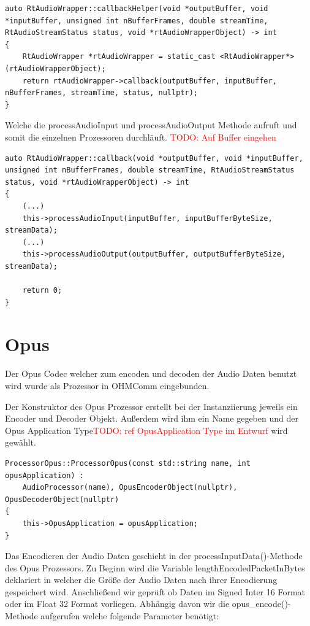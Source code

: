 \begin{lstlisting}[caption={callbackHelper Methode im RtAudioWrapper},label={Code:RtAudio}]
auto RtAudioWrapper::callbackHelper(void *outputBuffer, void *inputBuffer, unsigned int nBufferFrames, double streamTime, RtAudioStreamStatus status, void *rtAudioWrapperObject) -> int
{
    RtAudioWrapper *rtAudioWrapper = static_cast <RtAudioWrapper*> (rtAudioWrapperObject);
    return rtAudioWrapper->callback(outputBuffer, inputBuffer, nBufferFrames, streamTime, status, nullptr);
}
\end{lstlisting}

Welche die processAudioInput und processAudioOutput Methode aufruft und somit die einzelnen Prozessoren durchläuft. \textcolor{red}{TODO: Auf Buffer eingehen}

\begin{lstlisting}[caption={callback Methode im RtAudioWrapper},label={Code:RtAudio}]
auto RtAudioWrapper::callback(void *outputBuffer, void *inputBuffer, unsigned int nBufferFrames, double streamTime, RtAudioStreamStatus status, void *rtAudioWrapperObject) -> int
{
	(...)
	this->processAudioInput(inputBuffer, inputBufferByteSize, streamData);
	(...)
	this->processAudioOutput(outputBuffer, outputBufferByteSize, streamData);
	
	return 0;
}
\end{lstlisting}

\section{Opus}

Der Opus Codec welcher zum encoden und decoden der Audio Daten benutzt wird wurde als Prozessor in OHMComm eingebunden.

Der Konstruktor des Opus Prozessor erstellt bei der Instanziierung jeweils ein Encoder und Decoder Objekt. Außerdem wird ihm ein Name gegeben und der Opus Application Type\textcolor{red}{TODO: ref OpusApplication Type im Entwurf} wird gewählt.

\begin{lstlisting}[caption={Instanziierung des Opus Prozessors},label={Code:Opus}]
ProcessorOpus::ProcessorOpus(const std::string name, int opusApplication) : 
    AudioProcessor(name), OpusEncoderObject(nullptr), OpusDecoderObject(nullptr)
{
    this->OpusApplication = opusApplication;
}
\end{lstlisting}

Das Encodieren der Audio Daten geschieht in der processInputData()-Methode des Opus Prozessors. Zu Beginn wird die Variable lengthEncodedPacketInBytes deklariert in welcher die Größe der Audio Daten nach ihrer Encodierung gespeichert wird. Anschließend wir geprüft ob Daten im Signed Inter 16 Format oder im Float 32 Format vorliegen.
Abhängig davon wir die opus\_encode()-Methode aufgerufen welche folgende Parameter benötigt:


